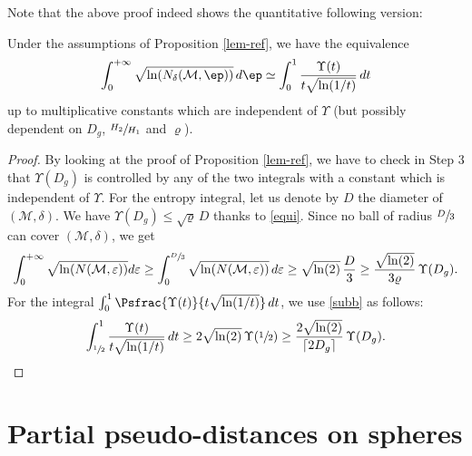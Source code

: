 Note that the above proof indeed shows the quantitative following version:
\begin{coro}\label{lem-quant}
Under the assumptions of Proposition \ref{lem-ref}, we have the equivalence\vspace*{-3pt}
\begin{equation*}
\int_{0}^{+\infty} \sqrt{\ln(N_\delta(\mathcal{M},\ep))}\,d\ep
\simeq\int_{0}^1 \frac{\Upsilon(t)}{t\sqrt{\ln(1/t)}} \,dt
\end{equation*}
up to multiplicative constants which are independent of $\Upsilon$ (but possibly dependent on $D_g$, $\sfrac{H_2}{H_1}$ and $\varrho$).
\end{coro}

\begin{proof}
By looking at the proof of Proposition \ref{lem-ref}, we have to check in Step 3 that $\Upsilon(D_g)$ is controlled by any of the two integrals with a constant which is independent of $\Upsilon$.
For the entropy integral, let us denote by $D$ the diameter of $(\mathcal{M},\delta)$. We have $\Upsilon(D_g)\leq \sqrt{\varrho}\, D$ thanks to \eqref{equi}. Since no ball of radius $\sfrac{D}{3}$ can cover $(\mathcal{M},\delta)$, we get
\begin{equation*}
\int_{0}^{+\infty} \sqrt{\ln(N(\mathcal{M},\varepsilon))} d\varepsilon \geq
\int_{0}^{\sfrac{D}{3}} \sqrt{\ln(N(\mathcal{M},\varepsilon))}\, d\varepsilon \geq
\sqrt{\ln(2)}\, \frac{D}{3} \geq \frac{\sqrt{\ln(2)}}{3\varrho}\, \Upsilon(D_g).
\end{equation*}
For the integral $\int_{0}^1 \Psfrac{\Upsilon(t)}{t\sqrt{\ln(1/t)}}\, dt$, we use \eqref{subb} as follows:
\begin{equation*}
\int_{\sfrac{1}{2}}^{1} \frac{\Upsilon(t)}{t\sqrt{\ln(1/t)}} \,dt \geq 2\sqrt{\ln(2)}\,\Upsilon(\sfrac{1}{2})\geq \frac{2\sqrt{\ln(2)}}{\lceil 2 D_g \rceil}\, \Upsilon(D_g).\qedhere
\end{equation*}
\end{proof}

\section{Partial pseudo-distances on spheres}\label{partial1}

